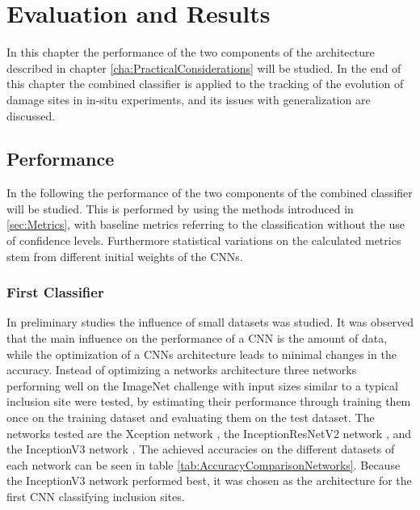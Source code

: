 
\chapter{Evaluation and Results} %

\label{Performance} %

In this chapter the performance of the two components of the architecture described in chapter \ref{cha:PracticalConsiderations} will be studied. In the end of this chapter the combined classifier is applied to the tracking of the evolution of damage sites in in-situ experiments, and its issues with generalization are discussed.

\section{Performance}
In the following the performance of the two components of the combined classifier will be studied. This is performed by using the methods introduced in \ref{sec:Metrics}, with baseline metrics referring to the classification without the use of confidence levels. Furthermore statistical variations on the calculated metrics stem from different initial weights of the CNNs. 

\subsection{First Classifier}

In preliminary studies the influence of small datasets was studied. It was observed that the main influence on the performance of a CNN is the amount of data, while the optimization of a CNNs architecture leads to minimal changes in the accuracy. Instead of optimizing a networks architecture three networks performing well on the ImageNet challenge \cite{imagenet_cvpr09} with input sizes similar to a typical inclusion site were tested, by estimating their performance through training them once on the training dataset and evaluating them on the test dataset. The networks tested are the Xception network \cite{Xception}, the InceptionResNetV2 network \cite{InceptionResNetV2}, and the InceptionV3 network \cite{inception}. The achieved accuracies on the different datasets of each network can be seen in table \ref{tab:AccuracyComparisonNetworks}. Because the InceptionV3 network performed best, it was chosen as the architecture for the first CNN classifying inclusion sites. \\


